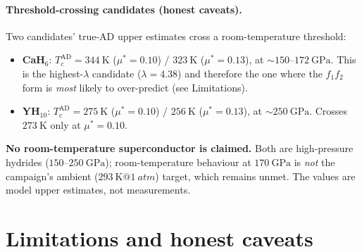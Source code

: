 \documentclass[11pt,a4paper]{article}
\begin{document}
\paragraph{Threshold-crossing candidates (honest caveats).}
Two candidates' true-AD upper estimates cross a room-temperature threshold:
\begin{itemize}\itemsep0.2em
\item \textbf{CaH$_6$}: $T_c^{\mathrm{AD}} = \SI{344}{\kelvin}$ ($\mu^*{=}0.10$)
  / $\SI{323}{\kelvin}$ ($\mu^*{=}0.13$), at $\sim$$150$--$\SI{172}{\giga\pascal}$.
  This is the highest-$\lambda$ candidate ($\lambda{=}4.38$) and therefore the
  one where the $f_1 f_2$ form is \emph{most} likely to over-predict (see
  Limitations).
\item \textbf{YH$_{10}$}: $T_c^{\mathrm{AD}} = \SI{275}{\kelvin}$ ($\mu^*{=}0.10$)
  / $\SI{256}{\kelvin}$ ($\mu^*{=}0.13$), at $\sim$$\SI{250}{\giga\pascal}$.
  Crosses $\SI{273}{\kelvin}$ only at $\mu^*{=}0.10$.
\end{itemize}
\textbf{No room-temperature superconductor is claimed.} Both are high-pressure
hydrides ($150$--$\SI{250}{\giga\pascal}$); room-temperature behaviour at
$\SI{170}{\giga\pascal}$ is \emph{not} the campaign's ambient
($\SI{293}{\kelvin}@\SI{1}{atm}$) target, which remains unmet. The values are
model upper estimates, not measurements.

\section{Limitations and honest caveats}
\label{sec:limits}
\end{document}
